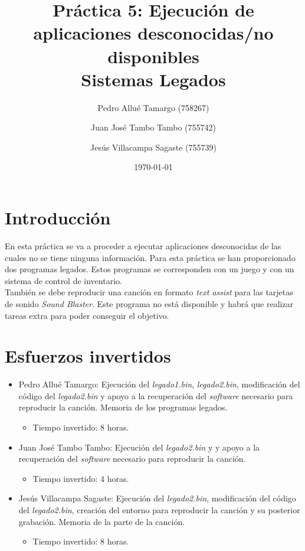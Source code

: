 \documentclass{article}
\begin{document}
\begin{titlepage}

\title{\textbf{
    {\Huge Práctica 5: Ejecución de aplicaciones desconocidas/no disponibles}\\
    {\Large Sistemas Legados}
}}
\author{
    Pedro Allué Tamargo (758267)
    \and
    Juan José Tambo Tambo (755742)
    \and
    Jesús Villacampa Sagaste (755739)
}
\date{\today}
\clearpage\maketitle
\thispagestyle{empty}
\tableofcontents
\end{titlepage}

\section{Introducción}

En esta práctica se va a proceder a ejecutar aplicaciones desconocidas de las cuales no se tiene ninguna información. Para esta práctica se han proporcionado dos programas legados. Estos programas se corresponden con un juego y con un sistema de control de inventario.\\
También se debe reproducir una canción en formato \textit{text assist} para las tarjetas de sonido \textit{Sound Blaster}. Este programa no está disponible y habrá que realizar tareas extra para poder conseguir el objetivo.\\


\section{Esfuerzos invertidos}

\begin{itemize}
    \item Pedro Allué Tamargo: Ejecución del \textit{legado1.bin}, \textit{legado2.bin}, modificación del código del \textit{legado2.bin} y apoyo a la recuperación del \textit{software} necesario para reproducir la canción. Memoria de los programas legados.
        \begin{itemize}
            \item Tiempo invertido: 8 horas.
        \end{itemize}
    \item Juan José Tambo Tambo: Ejecución del \textit{legado2.bin} y y apoyo a la recuperación del \textit{software} necesario para reproducir la canción.
        \begin{itemize}
            \item Tiempo invertido: 4 horas.
        \end{itemize}
    \item Jesús Villacampa Sagaste: Ejecución del \textit{legado2.bin}, modificación del código del \textit{legado2.bin}, creación del entorno para reproducir la canción y su posterior grabación. Memoria de la parte de la canción.
        \begin{itemize}
            \item Tiempo invertido: 8 horas.
        \end{itemize}
\end{itemize}
\end{document}

